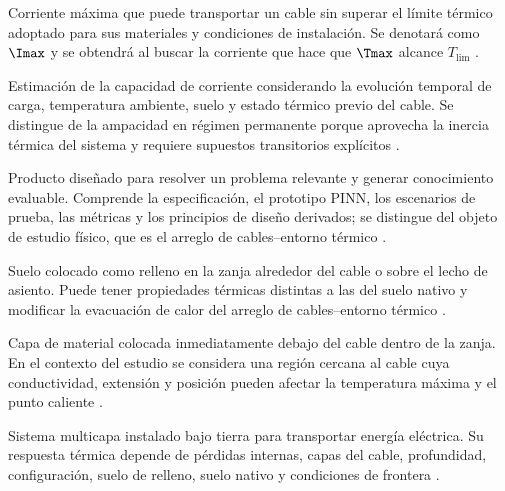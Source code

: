 \begin{description}[style=nextline,itemsep=0.5\baselineskip,parsep=0pt,topsep=0.25\baselineskip]
  \item[Ampacidad.] Corriente máxima que puede transportar un cable sin superar el límite térmico adoptado para sus materiales y condiciones de instalación. Se denotará como $\Imax$ y se obtendrá al buscar la corriente que hace que $\Tmax$ alcance $T_{\mathrm{lim}}$ \parencites[752--760]{neher1957}{anders2005}[cláusulas 4--5]{iec60287}[3--6]{enescu2021}.

  \item[Ampacidad dinámica o DTR.] Estimación de la capacidad de corriente considerando la evolución temporal de carga, temperatura ambiente, suelo y estado térmico previo del cable. Se distingue de la ampacidad en régimen permanente porque aprovecha la inercia térmica del sistema y requiere supuestos transitorios explícitos \parencites[cláusulas 2--4]{iec60853}[3--6]{enescu2021}[14843--14845]{fariz2026}.

  \item[Artefacto.] Producto diseñado para resolver un problema relevante y generar conocimiento evaluable. Comprende la especificación, el prototipo PINN, los escenarios de prueba, las métricas y los principios de diseño derivados; se distingue del objeto de estudio físico, que es el arreglo de cables--entorno térmico \parencites[55--56]{peffers2007}[342--350]{gregor2013}.

  \item[Suelo de relleno.] Suelo colocado como relleno en la zanja alrededor del cable o sobre el lecho de asiento. Puede tener propiedades térmicas distintas a las del suelo nativo y modificar la evacuación de calor del arreglo de cables--entorno térmico \parencites{anders2005}[1--3]{atoccsa2024}[1,10,16]{kim2025}[secciones 4--6]{ieee442}.

  \item[Lecho de asiento.] Capa de material colocada inmediatamente debajo del cable dentro de la zanja. En el contexto del estudio se considera una región cercana al cable cuya conductividad, extensión y posición pueden afectar la temperatura máxima y el punto caliente \parencites[1--4]{oclon2015}[1,10,16]{kim2025}[secciones 4--6]{ieee442}.

  \item[Cable eléctrico enterrado.] Sistema multicapa instalado bajo tierra para transportar energía eléctrica. Su respuesta térmica depende de pérdidas internas, capas del cable, profundidad, configuración, suelo de relleno, suelo nativo y condiciones de frontera \parencites[752--760]{neher1957}{anders2005}[3--5]{enescu2020}[fig.~2]{kim2025}.


\end{description}
